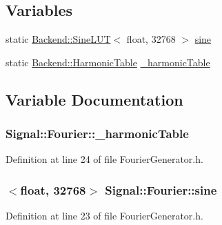 \subsection*{Variables}
\begin{DoxyCompactItemize}
\item 
static \hyperlink{classBackend_1_1SineLUT}{Backend\+::\+Sine\+L\+U\+T}$<$ float, 32768 $>$ \hyperlink{namespaceSignal_1_1Fourier_ab1bf3cdef768a49cf3e927b9daf7da9d}{sine}
\item 
static \hyperlink{classBackend_1_1HarmonicTable}{Backend\+::\+Harmonic\+Table} \hyperlink{namespaceSignal_1_1Fourier_a7b4ca1fc91cf3d4454c7a7084c2c2462}{\+\_\+harmonic\+Table}
\end{DoxyCompactItemize}


\subsection{Variable Documentation}
\hypertarget{namespaceSignal_1_1Fourier_a7b4ca1fc91cf3d4454c7a7084c2c2462}{
\subsubsection[{\+\_\+harmonic\+Table}]{ Signal\+::\+Fourier\+::\+\_\+harmonic\+Table\hspace{0.3cm}{\ttfamily [static]}}}\label{namespaceSignal_1_1Fourier_a7b4ca1fc91cf3d4454c7a7084c2c2462}


Definition at line 24 of file Fourier\+Generator.\+h.

\hypertarget{namespaceSignal_1_1Fourier_ab1bf3cdef768a49cf3e927b9daf7da9d}{
\subsubsection[{sine}]{$<$float, 32768$>$ Signal\+::\+Fourier\+::sine\hspace{0.3cm}{\ttfamily [static]}}}\label{namespaceSignal_1_1Fourier_ab1bf3cdef768a49cf3e927b9daf7da9d}


Definition at line 23 of file Fourier\+Generator.\+h.

